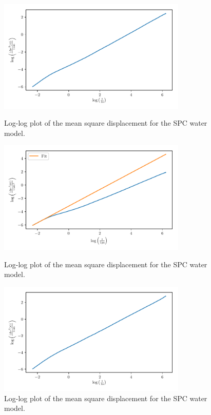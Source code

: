 \documentclass[a4paper,10pt,bibtotoc]{scrartcl}
\begin{document}
\begin{figure}[h]
\centering
 \includegraphics[width=0.8\textwidth]{MSD_SPC_LOG.pdf}
 \caption{Log-log plot of the mean square displacement for the SPC water model.}
 \label{fig:fig_gromacs_7}
 \includegraphics[width=0.8\textwidth]{MSD_SPCE_LOG.pdf}
 \caption{Log-log plot of the mean square displacement for the SPC water model.}
 \label{fig:fig_gromacs_8}
 \includegraphics[width=0.8\textwidth]{MSD_TIP3P_LOG.pdf}
 \caption{Log-log plot of the mean square displacement for the SPC water model.}
 \label{fig:fig_gromacs_9}
\end{figure}
\end{document}
